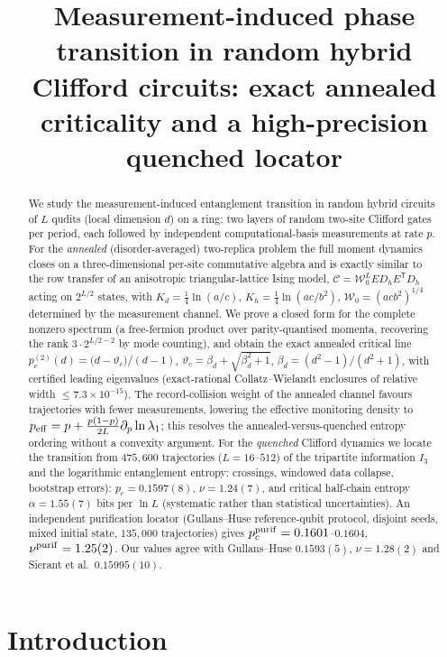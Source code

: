 \documentclass[11pt]{article}
\title{Measurement-induced phase transition in random hybrid Clifford circuits:
exact annealed criticality and a high-precision quenched locator}
\author{}
\date{}
\newcommand{\pctwo}{p_c^{(2)}}
\newcommand{\vth}{\vartheta}
\newcommand{\Ccomp}{\mathcal{C}}
\newcommand{\Wz}{\mathcal{W}_0}
\begin{document}
\maketitle

\begin{abstract}
We study the measurement-induced entanglement transition in random hybrid
circuits of $L$ qudits (local dimension $d$) on a ring: two layers of random
two-site Clifford gates per period, each followed by independent
computational-basis measurements at rate $p$.  For the \emph{annealed}
(disorder-averaged) two-replica problem the full moment dynamics closes on a
three-dimensional per-site commutative algebra and is exactly similar to the
row transfer of an anisotropic triangular-lattice Ising model,
$\Ccomp=\Wz^L E D_h E^{\mathsf T}D_h$ acting on $2^{L/2}$ states, with
$K_d=\tfrac14\ln(a/c)$, $K_h=\tfrac14\ln(ac/b^2)$, $\Wz=(acb^2)^{1/4}$
determined by the measurement channel.  We prove a closed form for the
complete nonzero spectrum (a free-fermion product over parity-quantised
momenta, recovering the rank $3\cdot2^{L/2-2}$ by mode counting), and obtain
the exact annealed critical line
$\pctwo(d)=\bigl(d-\vth_c\bigr)/(d-1)$, $\vth_c=\beta_d+\sqrt{\beta_d^2+1}$,
$\beta_d=(d^2-1)/(d^2+1)$, with certified leading eigenvalues (exact-rational
Collatz--Wielandt enclosures of relative width $\le7.3\times10^{-15}$).
The record-collision weight of the annealed channel favours trajectories with
fewer measurements, lowering the effective monitoring density to
$p_{\rm eff}=p+\tfrac{p(1-p)}{2L}\partial_p\ln\lambda_1$; this resolves the
annealed-versus-quenched entropy ordering without a convexity argument.
For the \emph{quenched} Clifford dynamics we locate the transition from
$475{,}600$ trajectories ($L=16$--$512$) of the tripartite information
$I_3$ and the logarithmic entanglement entropy: crossings, windowed data
collapse, bootstrap errors): $p_c=0.1597(8)$, $\nu=1.24(7)$, and critical
half-chain entropy $\alpha=1.55(7)$ bits per $\ln L$ (systematic rather than
statistical uncertainties).  An independent purification locator
(Gullans--Huse reference-qubit protocol, disjoint seeds, mixed initial state,
$135{,}000$ trajectories) gives $p_c^{\rm purif}=0.1601$--$0.1604$,
$\nu^{\rm purif}=1.25(2)$.  Our values agree with Gullans--Huse
$0.1593(5)$, $\nu=1.28(2)$ and Sierant et al.\ $0.15995(10)$.
\end{abstract}

\section{Introduction}\label{sec:intro}
\end{document}
